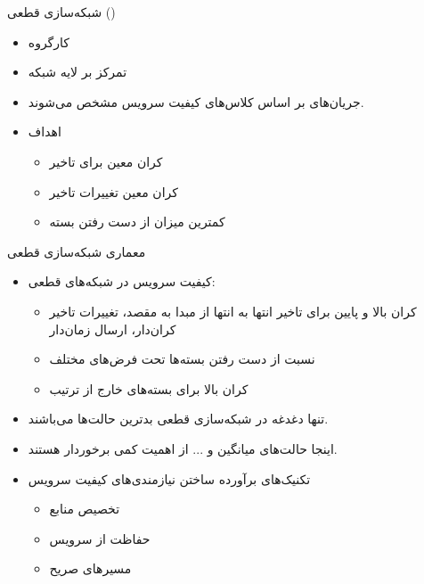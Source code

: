 \documentclass[dvipsnames]{beamer}
\makeatletter
\newcommand{\RTList}{\raggedleft\rightskip\@totalleftmargin}
\makeatother
\begin{document}
\begin{persian}
	\begin{frame}{شبکه‌سازی قطعی ()}
		\begin{itemize}\RTList{}
			\justifying%
			\item کارگروه 
			\item تمرکز بر لایه شبکه
			\item جریان‌های  بر اساس کلاس‌های کیفیت سرویس مشخص می‌شوند.
			\item اهداف
			\begin{itemize}\RTList{}
				\item کران معین برای تاخیر
				\item کران معین تغییرات تاخیر
				\item کمترین میزان از دست رفتن بسته
			\end{itemize}
		\end{itemize}
	\end{frame}

	\begin{frame}{معماری شبکه‌سازی قطعی}
		\begin{itemize}\RTList{}
			\justifying%
			\item کیفیت سرویس در شبکه‌های قطعی:
			\begin{itemize}\RTList{}
			  \item کران بالا و پایین برای تاخیر انتها به انتها از مبدا به مقصد، تغییرات تاخیر کران‌دار، ارسال زمان‌دار
			  \item نسبت از دست رفتن بسته‌ها تحت فرض‌های مختلف
			  \item کران بالا برای بسته‌های خارج از ترتیب
			\end{itemize}
		  \item تنها دغدغه در شبکه‌سازی قطعی بدترین حالت‌ها می‌باشند.
		  \item اینجا حالت‌های میانگین و ... از اهمیت کمی برخوردار هستند.
		  \item تکنیک‌های برآورده ساختن نیازمندی‌های کیفیت سرویس
		  \begin{itemize}\RTList{}
			\item تخصیص منابع
			\item حفاظت از سرویس
			\item مسیرهای صریح
		  \end{itemize}
		\end{itemize}
	\end{frame}


\end{persian}
\end{document}
